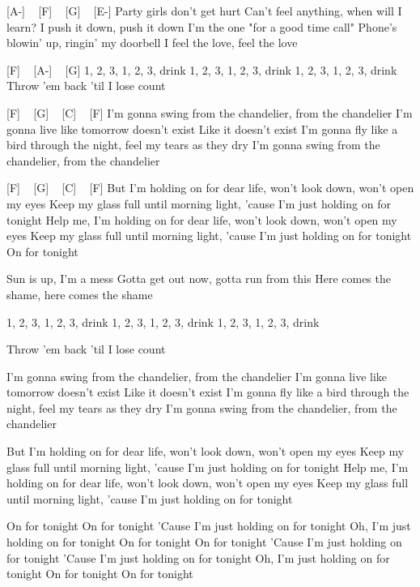 
[A-] ~ [F] ~ [G] ~ [E-]
Party girls don't get hurt
Can't feel anything, when will I learn?
I push it down, push it down
I'm the one "for a good time call"
Phone's blowin' up, ringin' my doorbell
I feel the love, feel the love

[F] ~ [A-] ~ [G]
1, 2, 3, 1, 2, 3, drink
1, 2, 3, 1, 2, 3, drink
1, 2, 3, 1, 2, 3, drink
Throw 'em back 'til I lose count

[F] ~ [G] ~ [C] ~ [F] 
I'm gonna swing from the chandelier, from the chandelier
I'm gonna live like tomorrow doesn't exist
Like it doesn't exist
I'm gonna fly like a bird through the night, feel my tears as they dry
I'm gonna swing from the chandelier, from the chandelier

[F] ~ [G] ~ [C] ~ [F]
But I'm holding on for dear life, won't look down, won't open my eyes
Keep my glass full until morning light, 'cause I'm just holding on for tonight
Help me, I'm holding on for dear life, won't look down, won't open my eyes
Keep my glass full until morning light, 'cause I'm just holding on for tonight
On for tonight

Sun is up, I'm a mess
Gotta get out now, gotta run from this
Here comes the shame, here comes the shame

1, 2, 3, 1, 2, 3, drink
1, 2, 3, 1, 2, 3, drink
1, 2, 3, 1, 2, 3, drink


Throw 'em back 'til I lose count

I'm gonna swing from the chandelier, from the chandelier
I'm gonna live like tomorrow doesn't exist
Like it doesn't exist
I'm gonna fly like a bird through the night, feel my tears as they dry
I'm gonna swing from the chandelier, from the chandelier

But I'm holding on for dear life, won't look down, won't open my eyes
Keep my glass full until morning light, 'cause I'm just holding on for tonight
Help me, I'm holding on for dear life, won't look down, won't open my eyes
Keep my glass full until morning light, 'cause I'm just holding on for tonight

On for tonight
On for tonight
'Cause I'm just holding on for tonight
Oh, I'm just holding on for tonight
On for tonight
On for tonight
'Cause I'm just holding on for tonight
'Cause I'm just holding on for tonight
Oh, I'm just holding on for tonight
On for tonight
On for tonight 